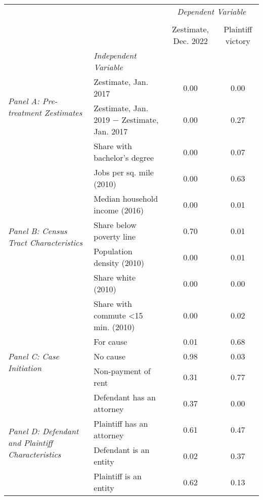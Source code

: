 \begin{tabular}{llcc}
\toprule
 &  & \multicolumn{2}{c}{\textit{Dependent Variable}} \\
\cline{3-4}
\\
 &  & Zestimate, Dec. 2022 & Plaintiff victory \\
 & \emph{Independent Variable} &  &  \\
\midrule
\multirow[c]{2}{3cm}{\textit{Panel A: Pre-treatment Zestimates}} & Zestimate, Jan. 2017 & 0.00 & 0.00 \\
 & Zestimate, Jan. 2019 $-$ Zestimate, Jan. 2017 & 0.00 & 0.27 \\
\cline{1-4}
\multirow[c]{7}{3cm}{\textit{Panel B: Census Tract Characteristics}} & Share with bachelor's degree & 0.00 & 0.07 \\
 & Jobs per sq. mile (2010) & 0.00 & 0.63 \\
 & Median household income (2016) & 0.00 & 0.01 \\
 & Share below poverty line & 0.70 & 0.01 \\
 & Population density (2010) & 0.00 & 0.01 \\
 & Share white (2010) & 0.00 & 0.00 \\
 & Share with commute <15 min. (2010) & 0.00 & 0.02 \\
\cline{1-4}
\multirow[c]{3}{3cm}{\textit{Panel C: Case Initiation}} & For cause & 0.01 & 0.68 \\
 & No cause & 0.98 & 0.03 \\
 & Non-payment of rent & 0.31 & 0.77 \\
\cline{1-4}
\multirow[c]{4}{3cm}{\textit{Panel D: Defendant and Plaintiff Characteristics}} & Defendant has an attorney & 0.37 & 0.00 \\
 & Plaintiff has an attorney & 0.61 & 0.47 \\
 & Defendant is an entity & 0.02 & 0.37 \\
 & Plaintiff is an entity & 0.62 & 0.13 \\
\cline{1-4}
\bottomrule
\end{tabular}
